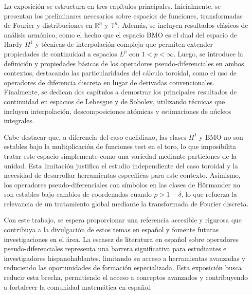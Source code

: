 La exposición se estructura en tres capítulos principales. Inicialmente, se presentan los preliminares necesarios sobre espacios de funciones, transformadas de Fourier y distribuciones en $\mathbb{R}^n$ y $\mathbb{T}^n$. Además, se incluyen resultados clásicos de análisis armónico, como el hecho que el espacio $\mathrm{BMO}$ es el dual del espacio de Hardy $H^1$ y técnicas de interpolación compleja que permiten extender propiedades de continuidad a espacios $L^p$ con $1 < p < \infty$. Luego, se introduce la definición y propiedades básicas de los operadores pseudo-diferenciales en ambos contextos, destacando las particularidades del cálculo toroidal, como el uso de operadores de diferencia discreta en lugar de derivadas convencionales. Finalmente, se dedican dos capítulos a demostrar los principales resultados de continuidad en espacios de Lebesgue y de Sobolev, utilizando técnicas que incluyen interpolación, descomposiciones atómicas y estimaciones de núcleos integrales.

Cabe destacar que, a diferencia del caso euclidiano, las clases $H^1$ y $\mathrm{BMO}$ no son estables bajo la multiplicación de funciones test en el toro, lo que imposibilita tratar este espacio simplemente como una variedad mediante particiones de la unidad. Esta limitación justifica el estudio independiente del caso toroidal y la necesidad de desarrollar herramientas específicas para este contexto. Asimismo, los operadores pseudo-diferenciales con símbolos en las clases de Hörmander no son estables bajo cambios de coordenadas cuando $\rho > 1 - \delta$, lo que refuerza la relevancia de un tratamiento global mediante la transformada de Fourier discreta.

Con este trabajo, se espera proporcionar una referencia accesible y rigurosa que contribuya a la divulgación de estos temas en español y fomente futuras investigaciones en el área. La escasez de literatura en español sobre operadores pseudo-diferenciales representa una barrera significativa para estudiantes e investigadores hispanohablantes, limitando su acceso a herramientas avanzadas y reduciendo las oportunidades de formación especializada. Esta exposición busca reducir esta brecha, permitiendo el acceso a conceptos avanzados y contribuyendo a fortalecer la comunidad matemática en español.